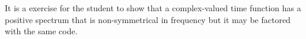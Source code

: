 \begin{comment}
\subsection{Code}
\footnotesize
\begin{verbatim}
subroutine kolmogoroff( n, cx)  # Spectral factorization.
integer              i, n         # input:  cx = amplitude spectrum
complex              cx(n)        # output: cx = FT of min phase wavelet
do i= 1, n                     
        cx(i) = clog( cx(i) )
call ftu( -1., n, cx)
do i= 2, n/2 {                   # Make it causal changing only the odd part.
        cx(i)     = cx(i) * 2.
        cx(n-i+2) = 0.
        }
call ftu( +1., n, cx)
do i= 1, n
        cx(i) = cexp( cx(i))
return; end


subroutine ftu( signi, nx, cx )	          # Fourier transform
#   complex fourier transform with traditional scaling (FGDP)
#
#               1         nx          signi*2*pi*i*(j-1)*(k-1)/nx
#   cx(k)  =  -------- * sum cx(j) * e
#              scale     j=1             for k=1,2,...,nx=2**integer
#
#  scale=1 for forward transform signi=1, otherwise scale=1/nx
integer nx, i, j, k, m, istep
real    signi, arg
complex cx(nx), cmplx, cw, cdel, ct
i=1;  while( i<nx) i=2*i
if( i != nx )    call erexit('ftu: nx not a power of 2')
do i= 1, nx
        if( signi<0.)
                cx(i) = cx(i) / nx
j = 1;  k = 1
do i= 1, nx {
        if (i<=j) { ct = cx(j); cx(j) = cx(i); cx(i) = ct }
        m = nx/2
        while (j>m && m>1) { j = j-m; m = m/2 }         # "&&" means .AND.
        j = j+m
        }
repeat {
        istep = 2*k;   cw = 1.;   arg = signi*3.14159265/k
        cdel = cmplx( cos(arg), sin(arg))
        do m= 1, k {
                do i= m, nx, istep
                        { ct=cw*cx(i+k);  cx(i+k)=cx(i)-ct;  cx(i)=cx(i)+ct }
                cw = cw * cdel
                }
        k = istep
        if(k>=nx) break
        }
return; end
\end{verbatim}
\normalsize
\par
Included above is a fast Fourier transform code,
a compact version with the restriction the data length is a power of 2.
Zero time and frequency are the first point in the vector, then positive times, then negative times.
\end{comment}

\par
It is a exercise for the student to show that
a complex-valued time function has
a positive spectrum that is non-symmetrical in frequency
but it may be factored with the same code.


